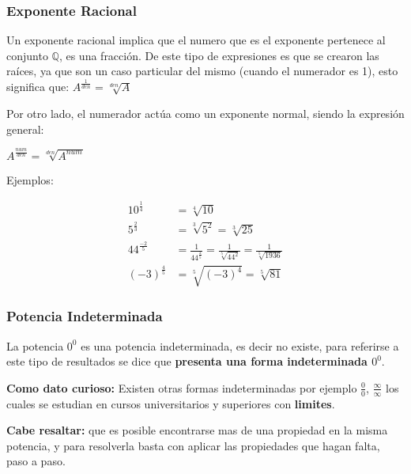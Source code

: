     \subsubsection*{Exponente Racional}

    Un exponente racional implica que el numero que es el exponente pertenece
    al conjunto $\mathbb{Q}$, es una fracción.
    De este tipo de expresiones es que se crearon las raíces, ya que son un
    caso particular del mismo (cuando el numerador es 1), esto significa que:
    $A^\frac{1}{den} = \sqrt[den]{A}$


    Por otro lado, el numerador actúa como un exponente normal, siendo la
    expresión general:

    $A^{\frac{num}{den} } = \sqrt[den]{A^{num}}$

    Ejemplos:

    \begin{align*}
        10^{\frac{1}{4}} &= \sqrt[4]{10} 		\\
        5^{\frac{2}{3} } &= \sqrt[3]{5^2} = \sqrt[3]{25} \\
        44^{\frac{-2}{5} }&= \frac{1}{44^{\frac{2}{5}}} = \frac{1}{ \sqrt[5]{44^2} }= \frac{1}{ \sqrt[5]{1936} } \\
        (-3)^{\frac{4}{5}} &= \sqrt[5]{(-3)^4} = \sqrt[5]{81}
    \end{align*}



    \subsubsection*{Potencia Indeterminada}
        La potencia $0^0$ es una potencia indeterminada, es decir no existe,
        para referirse a este tipo de resultados se dice que \textbf{presenta una
        forma indeterminada $0^0$}.

        \textbf{Como dato curioso: }
        Existen otras formas indeterminadas por ejemplo $\frac{0}{0}$,
        $\frac{\infty}{\infty}$ los cuales se estudian en cursos universitarios y
        superiores con \textbf{limites}.

\vspace*{1cm}

    \textbf{Cabe resaltar:} que es posible encontrarse mas de una propiedad en
    la misma potencia, y para resolverla basta con aplicar las propiedades que hagan
    falta, paso a paso.


